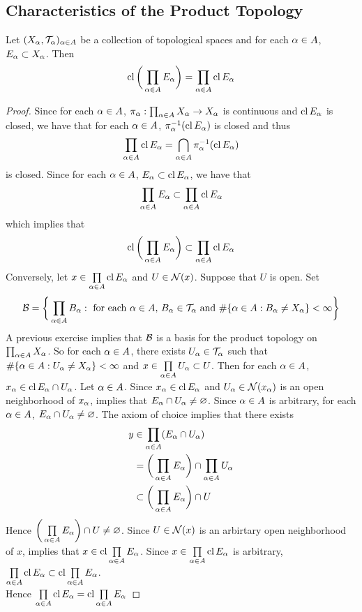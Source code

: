 \documentclass{book}
\begin{document}
	\subsection{Characteristics of the Product Topology}

	\begin{ex}  
		Let $(X_{\alpha}, \mathcal{T}_{\alpha})_{\alpha \in A}$ be a collection of topological spaces and for each $\alpha \in A$, $E_{\alpha} \subset X_{\alpha}$. Then 
		$$\operatorname{cl} \bigg( \prod_{\alpha \in A} E_{\alpha} \bigg) = \prod_{\alpha \in A} \operatorname{cl} E_{\alpha}$$ 
		 
	\end{ex}

	\begin{proof}
		Since for each $\alpha \in A$, $\pi_{\alpha}: \prod_{\alpha \in A}X_{\alpha} \rightarrow X_{\alpha}$ is continuous and $\operatorname{cl} E_{\alpha}$ is closed, we have that for each $\alpha \in A$, $ \pi_{\alpha}^{-1}(\operatorname{cl} E_{\alpha})$ is closed and thus 
		$$\prod_{\alpha \in A} \operatorname{cl} E_{\alpha} = \bigcap_{\alpha \in A} \pi_{\alpha}^{-1}(\operatorname{cl} E_{\alpha})$$
		is closed. Since for each $\alpha \in A$, $E_{\alpha} \subset \operatorname{cl} E_{\alpha}$, we have that 
		$$ \prod_{\alpha \in A}  E_{\alpha}  \subset \prod_{\alpha \in A} \operatorname{cl} E_{\alpha}$$ 
		which implies that 
		$$ \operatorname{cl} \bigg( \prod_{\alpha \in A}  E_{\alpha} \bigg)  \subset \prod_{\alpha \in A} \operatorname{cl} E_{\alpha}$$ 
		Conversely, let $x \in \prod\limits_{\alpha \in A} \operatorname{cl} E_{\alpha}$ and $U \in \mathcal{N}(x)$. Suppose that $U$ is open. Set 
		$$\mathcal{B} = \bigg \{\prod_{\alpha \in A}B_{\alpha}: \text{ for each $\alpha \in A$,  $B_{\alpha} \in \mathcal{T}_{\alpha}$ and $\# \{\alpha \in A: B_{\alpha} \neq X_{\alpha}\} < \infty$} \bigg\}$$
		A previous exercise implies that $\mathcal{B}$ is a basis for the product topology on $\prod_{\alpha \in A}X_{\alpha}$. So for each $\alpha \in A$, there exists $U_{\alpha} \in \mathcal{T}_{\alpha}$ such that $\# \{\alpha \in A: U_{\alpha} \neq X_{\alpha}\} < \infty$ and $x \in \prod\limits_{\alpha \in A} U_{\alpha} \subset U$. Then for each $\alpha \in A$, $x_{\alpha} \in \operatorname{cl} E_{\alpha} \cap U_{\alpha}$. Let $\alpha \in A$. Since $x_{\alpha} \in \operatorname{cl} E_{\alpha}$ and $U_{\alpha} \in \mathcal{N}(x_{\alpha})$ is an open neighborhood of $x_{\alpha}$,  implies that $E_{\alpha} \cap U_{\alpha} \neq \varnothing$. Since $\alpha \in A$ is arbitrary, for each $\alpha \in A$, $E_{\alpha} \cap U_{\alpha} \neq \varnothing$. The axiom of choice implies that there exists
		\begin{align*}
			y 
			& \in \prod\limits_{\alpha \in A}  (E_{\alpha} \cap U_{\alpha} ) \\
			& = \bigg( \prod\limits_{\alpha \in A} E_{\alpha} \bigg) \cap \prod_{\alpha \in A} U_{\alpha} \\
			& \subset \bigg( \prod\limits_{\alpha \in A} E_{\alpha} \bigg) \cap U
		\end{align*}
		Hence $\bigg( \prod\limits_{\alpha \in A} E_{\alpha} \bigg) \cap U \neq \varnothing$. Since $U \in \mathcal{N}(x)$ is an arbirtary open neighborhood of $x$,  implies that $x \in \operatorname{cl} \prod\limits_{\alpha \in A} E_{\alpha}$. Since $x \in \prod\limits_{\alpha \in A} \operatorname{cl} E_{\alpha}$ is arbitrary, $\prod\limits_{\alpha \in A} \operatorname{cl} E_{\alpha} \subset  \operatorname{cl} \prod\limits_{\alpha \in A} E_{\alpha}$. \\
		Hence $\prod\limits_{\alpha \in A} \operatorname{cl} E_{\alpha} = \operatorname{cl} \prod\limits_{\alpha \in A} E_{\alpha}$
	\end{proof}
\end{document}

